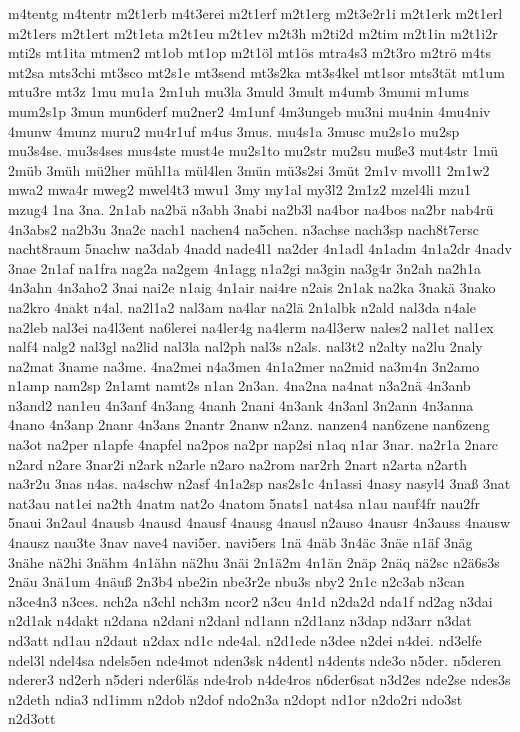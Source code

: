 {m4tentg
m4tentr
m2t1erb
m4t3erei
m2t1erf
m2t1erg
m2t3e2r1i
m2t1erk
m2t1erl
m2t1ers
m2t1ert
m2t1eta
m2t1eu
m2t1ev
m2t3h
m2ti2d
m2tim
m2t1in
m2t1i2r
mti2s
mt1ita
mtmen2
mt1ob
mt1op
m2t1öl
mt1ös
mtra4s3
m2t3ro
m2trö
m4ts
mt2sa
mts3chi
mt3sco
mt2s1e
mt3send
mt3s2ka
mt3s4kel
mt1sor
mts3tät
mt1um
mtu3re
mt3z
1mu
mu1a
2m1uh
mu3la
3muld
3mult
m4umb
3mumi
m1ums
mum2s1p
3mun
mun6derf
mu2ner2
4m1unf
4m3ungeb
mu3ni
mu4nin
4mu4niv
4munw
4munz
muru2
mu4r1uf
m4us
3mus.
mu4s1a
3musc
mu2s1o
mu2sp
mu3s4se.
mu3s4ses
mus4ste
must4e
mu2s1to
mu2str
mu2su
muße3
mut4str
1mü
2müb
3müh
mü2her
mühl1a
mül4len
3mün
mü3s2si
3müt
2m1v
mvoll1
2m1w2
mwa2
mwa4r
mweg2
mwel4t3
mwu1
3my
my1al
my3l2
2m1z2
mzel4li
mzu1
mzug4
1na
3na.
2n1ab
na2bä
n3abh
3nabi
na2b3l
na4bor
na4bos
na2br
nab4rü
4n3abs2
na2b3u
3na2c
nach1
nachen4
na5chen.
n3achse
nach3sp
nach8t7ersc
nacht8raum
5nachw
na3dab
4nadd
nade4l1
na2der
4n1adl
4n1adm
4n1a2dr
4nadv
3nae
2n1af
na1fra
nag2a
na2gem
4n1agg
n1a2gi
na3gin
na3g4r
3n2ah
na2h1a
4n3ahn
4n3aho2
3nai
nai2e
n1aig
4n1air
nai4re
n2ais
2n1ak
na2ka
3nakä
3nako
na2kro
4nakt
n4al.
na2l1a2
nal3am
na4lar
na2lä
2n1albk
n2ald
nal3da
n4ale
na2leb
nal3ei
na4l3ent
na6lerei
na4ler4g
na4lerm
na4l3erw
nales2
nal1et
nal1ex
nalf4
nalg2
nal3gl
na2lid
nal3la
nal2ph
nal3s
n2als.
nal3t2
n2alty
na2lu
2naly
na2mat
3name
na3me.
4na2mei
n4a3men
4n1a2mer
na2mid
na3m4n
3n2amo
n1amp
nam2sp
2n1amt
namt2s
n1an
2n3an.
4na2na
na4nat
n3a2nä
4n3anb
n3and2
nan1eu
4n3anf
4n3ang
4nanh
2nani
4n3ank
4n3anl
3n2ann
4n3anna
4nano
4n3anp
2nanr
4n3ans
2nantr
2nanw
n2anz.
nanzen4
nan6zene
nan6zeng
na3ot
na2per
n1apfe
4napfel
na2pos
na2pr
nap2si
n1aq
n1ar
3nar.
na2r1a
2narc
n2ard
n2are
3nar2i
n2ark
n2arle
n2aro
na2rom
nar2rh
2nart
n2arta
n2arth
na3r2u
3nas
n4as.
na4schw
n2asf
4n1a2sp
nas2s1c
4n1assi
4nasy
nasyl4
3naß
3nat
nat3au
nat1ei
na2th
4natm
nat2o
4natom
5nats1
nat4sa
n1au
nauf4fr
nau2fr
5naui
3n2aul
4nausb
4nausd
4nausf
4nausg
4nausl
n2auso
4nausr
4n3auss
4nausw
4nausz
nau3te
3nav
nave4
navi5er.
navi5ers
1nä
4näb
3n4äc
3näe
n1äf
3näg
3nähe
nä2hi
3nähm
4n1ähn
nä2hu
3näi
2n1ä2m
4n1än
2näp
2näq
nä2sc
n2ä6s3s
2näu
3nä1um
4näuß
2n3b4
nbe2in
nbe3r2e
nbu3s
nby2
2n1c
n2c3ab
n3can
n3ce4n3
n3ces.
nch2a
n3chl
nch3m
ncor2
n3cu
4n1d
n2da2d
nda1f
nd2ag
n3dai
n2d1ak
n4dakt
n2dana
n2dani
n2danl
nd1ann
n2d1anz
n3dap
nd3arr
n3dat
nd3att
nd1au
n2daut
n2dax
nd1c
nde4al.
n2d1ede
n3dee
n2dei
n4dei.
nd3elfe
ndel3l
ndel4sa
ndels5en
nde4mot
nden3sk
n4dentl
n4dents
nde3o
n5der.
n5deren
nderer3
nd2erh
n5deri
nder6läs
nde4rob
n4de4ros
n6der6sat
n3d2es
nde2se
ndes3s
n2deth
ndia3
nd1imm
n2dob
n2dof
ndo2n3a
n2dopt
nd1or
n2do2ri
ndo3st
n2d3ott
}
